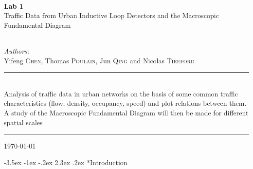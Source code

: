 \documentclass[a4paper, 12pt,oneside]{article}
\makeatletter
\renewcommand{\section}{\@startsection {section}{1}{\z@}%
             {-3.5ex \@plus -1ex \@minus -.2ex}%
             {2.3ex \@plus.2ex}%
             {\normalfont\normalsize\bfseries}}
\makeatother
\begin{document}
\begin{titlepage}
\begin{center}
\HRule \\[0.4cm]
{ \huge  \textbf{Lab 1}}
\\
\bigbreak
{\huge Traffic Data from Urban Inductive Loop Detectors and the Macroscopic Fundamental Diagram}\\[0.15cm] %
\HRule \\[1.5cm]
\end{center}
\noindent
\begin{minipage}[t]{1\textwidth}
\large

\emph{Authors:}\\
Yifeng \textsc{Chen}, Thomas \textsc{Poulain}, Jun \textsc{Qing} and Nicolas \textsc{Tireford} \\ %
\end{minipage}


\begin{center}
\hrule\vspace{0.5cm}
{
 \\
Analysis of traffic data in urban networks on the basis of some common traffic
characteristics (flow, density, occupancy, speed) and plot relations between them. A study of the Macroscopic Fundamental Diagram will then be made for different spatial scales
\justify


}\vspace{0.5cm}
\hrule
\vspace{1.cm}

{\large \today}\\[2cm] %

\vfill %
\end{center}
\end{titlepage}

\newpage
\tableofcontents

\newpage
\justify

\section*{Introduction}
\end{document}
